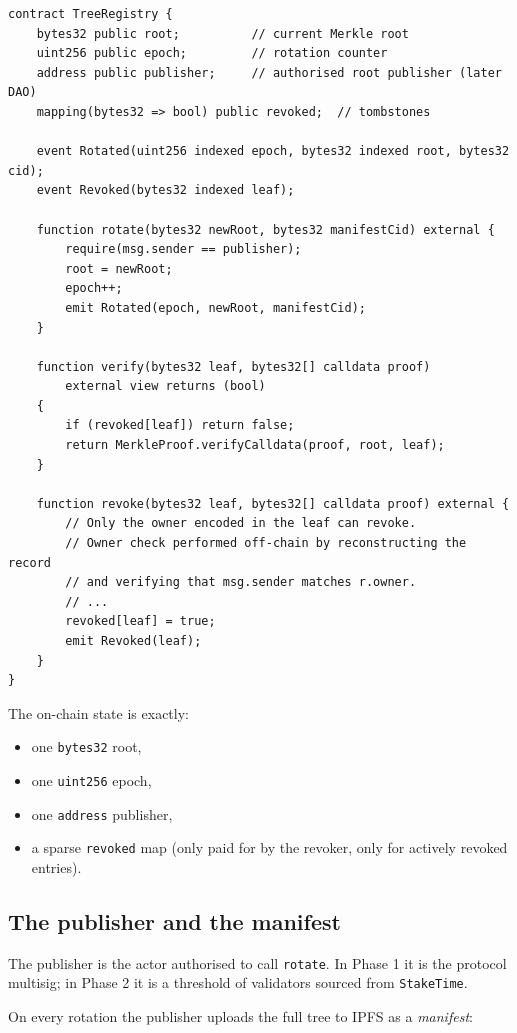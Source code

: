 \documentclass[11pt,a4paper]{article}
\begin{document}
\begin{lstlisting}[style=solidity]
contract TreeRegistry {
    bytes32 public root;          // current Merkle root
    uint256 public epoch;         // rotation counter
    address public publisher;     // authorised root publisher (later DAO)
    mapping(bytes32 => bool) public revoked;  // tombstones

    event Rotated(uint256 indexed epoch, bytes32 indexed root, bytes32 cid);
    event Revoked(bytes32 indexed leaf);

    function rotate(bytes32 newRoot, bytes32 manifestCid) external {
        require(msg.sender == publisher);
        root = newRoot;
        epoch++;
        emit Rotated(epoch, newRoot, manifestCid);
    }

    function verify(bytes32 leaf, bytes32[] calldata proof)
        external view returns (bool)
    {
        if (revoked[leaf]) return false;
        return MerkleProof.verifyCalldata(proof, root, leaf);
    }

    function revoke(bytes32 leaf, bytes32[] calldata proof) external {
        // Only the owner encoded in the leaf can revoke.
        // Owner check performed off-chain by reconstructing the record
        // and verifying that msg.sender matches r.owner.
        // ...
        revoked[leaf] = true;
        emit Revoked(leaf);
    }
}
\end{lstlisting}

The on-chain state is exactly:
\begin{itemize}
    \item one \texttt{bytes32} root,
    \item one \texttt{uint256} epoch,
    \item one \texttt{address} publisher,
    \item a sparse \texttt{revoked} map (only paid for by the revoker, only for actively revoked entries).
\end{itemize}

\subsection{The publisher and the manifest}

The publisher is the actor authorised to call \texttt{rotate}. In Phase 1 it is the protocol multisig; in Phase 2 it is a threshold of validators sourced from \texttt{StakeTime}.

On every rotation the publisher uploads the full tree to IPFS as a \emph{manifest}:
\end{document}
